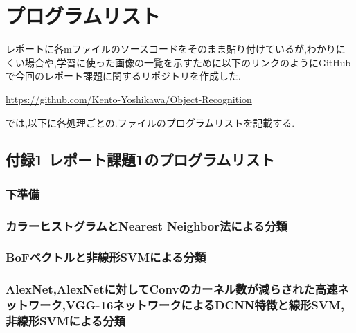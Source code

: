 \documentclass[11pt,a4j]{jreport}
\begin{document}
\appendix
\chapter{プログラムリスト}
レポートに各mファイルのソースコードをそのまま貼り付けているが,わかりにくい場合や,学習に使った画像の一覧を示すために以下のリンクのようにGitHubで今回のレポート課題に関するリポジトリを作成した.

\url{https://github.com/Kento-Yoshikawa/Object-Recognition}

では,以下に各処理ごとの.ファイルのプログラムリストを記載する.

\section{付録1 レポート課題1のプログラムリスト}
\subsection{下準備}


\subsection{カラーヒストグラムとNearest Neighbor法による分類}


\subsection{BoFベクトルと非線形SVMによる分類}



\subsection{AlexNet,AlexNetに対してConvのカーネル数が減らされた高速ネットワーク,VGG-16ネットワークによるDCNN特徴と線形SVM,非線形SVMによる分類}

\end{document}
